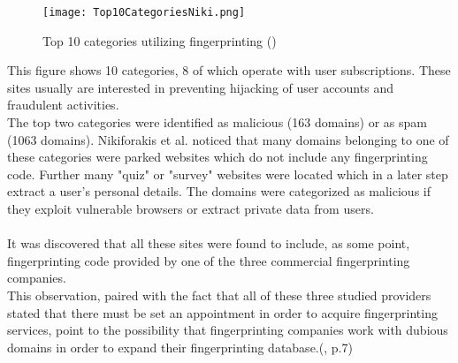 \begin{figure}[H]
\centering
		\texttt{[image: Top10CategoriesNiki.png]}
		\caption{Top 10 categories utilizing fingerprinting (\textcite{Top10Niki})}
		\label{Top10Niki}
\end{figure}
This figure shows 10 categories, 8 of which operate with user subscriptions. These sites usually are interested in preventing hijacking of user accounts and fraudulent activities.\\
The top two categories were identified as malicious (163 domains) or as spam (1063 domains). Nikiforakis et al. noticed that many domains belonging to one of these categories were parked websites which do not include any fingerprinting code. Further many "quiz" or "survey" websites were located which in a later step extract a user's personal details. The domains were categorized as malicious if they exploit vulnerable browsers or extract private data from users.\\\\
It was discovered that all these sites were found to include, as some point, fingerprinting code provided by one of the three commercial fingerprinting companies.\\
This observation, paired with the fact that all of these three studied providers stated that there must be set an appointment in order to acquire fingerprinting services, point to the possibility that fingerprinting companies work with dubious domains in order to expand their fingerprinting database.(\textcite{nikiforakis13}, p.7)

